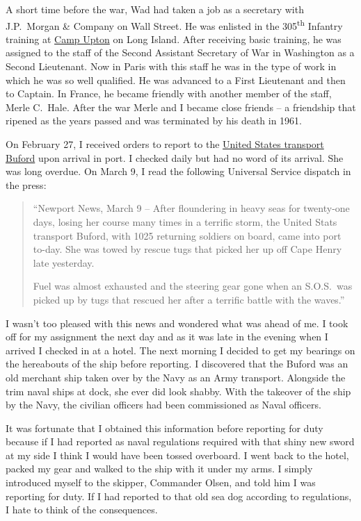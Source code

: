 \documentclass[12pt]{book}              %
\begin{document}
A short time before the war, Wad had taken a job as a secretary with J.P.~Morgan \& Company on Wall Street. He was enlisted in the 305\textsuperscript{th} Infantry training at \href{http://en.wikipedia.org/wiki/Camp_Upton}{Camp Upton} on Long Island. After receiving basic training, he was assigned to the staff of the Second Assistant Secretary of War in Washington as a Second Lieutenant. Now in Paris with this staff he was in the type of work in which he was so well qualified. He was advanced to a First Lieutenant and then to Captain. In France, he became friendly with another member of the staff, Merle C.~Hale. After the war Merle and I became close friends -- a friendship that ripened as the years passed and was terminated by his death in 1961. 

On February 27, I received orders to report to the \href{http://en.wikipedia.org/wiki/USAT_Buford}{United States transport Buford} upon arrival in port. I checked daily but had no word of its arrival. She was long overdue. On March 9, I read the following Universal Service dispatch in the press:

\begin{quote}
``Newport News, March 9 -- After floundering in heavy seas for twenty-one days, losing her course many times in a terrific storm, the United Stats transport Buford, with 1025 returning soldiers on board, came into port to-day. She was towed by rescue tugs that picked her up off Cape Henry late yesterday. 

Fuel was almost exhausted and the steering gear gone when an S.O.S.~was picked up by tugs that rescued her after a terrific battle with the waves.''
\end{quote}

I wasn't too pleased with this news and wondered what was ahead of me. I took off for my assignment the next day and as it was late in the evening when I arrived I checked in at a hotel. The next morning I decided to get my bearings on the hereabouts of the ship before reporting. I discovered that the Buford was an old merchant ship taken over by the Navy as an Army transport. Alongside the trim naval ships at dock, she ever did look shabby. With the takeover of the ship by the Navy, the civilian officers had been commissioned as Naval officers. 

It was fortunate that I obtained this information before reporting for duty because if I had reported as naval regulations required with that shiny new sword at my side I think I would have been tossed overboard. I went back to the hotel, packed my gear and walked to the ship with it under my arms. I simply introduced myself to the skipper, Commander Olsen, and told him I was reporting for duty. If I had reported to that old sea dog according to regulations, I hate to think of the consequences.
\end{document}
